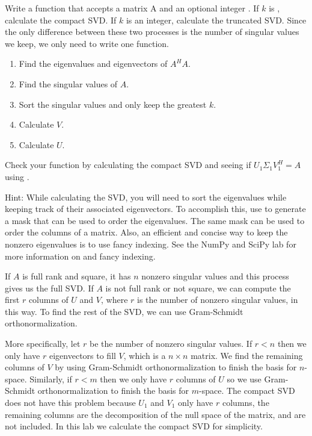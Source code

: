 \begin{problem}
Write a function  that accepts a matrix A and an optional integer . If $k$ is , calculate the compact SVD. If $k$ is an integer, calculate the truncated SVD.
Since the only difference between these two processes is the number of singular values we keep, we only need to write one function.

\begin{enumerate}
\item Find the eigenvalues and eigenvectors of $A^H A$.
\item Find the singular values of $A$.
\item Sort the singular values and only keep the greatest $k$.
\item Calculate $V$.
\item Calculate $U$.
\end{enumerate}

Check your function by calculating the compact SVD and seeing if $U_1\Sigma_1 V_1^H = A$ using .

Hint: While calculating the SVD, you will need to sort the eigenvalues while keeping track of their associated eigenvectors. 
To accomplish this, use  to generate a mask that can be used to order the eigenvalues. The same mask can be used to order the columns of a matrix. 
Also, an efficient and concise way to keep the nonzero eigenvalues is to use fancy indexing. 
See the NumPy and SciPy lab for more information on  and fancy indexing. 

\label{prob:calc_svd}
\end{problem}

If $A$ is full rank and square, it has $n$ nonzero singular values and this process gives us the full SVD.
If $A$ is not full rank or not square, we can compute the first $r$ columns of $U$ and $V$, where $r$ is the number of nonzero singular values, in this way.
To find the rest of the SVD, we can use Gram-Schmidt orthonormalization.

More specifically, let $r$ be the number of nonzero singular values.
If $r<n$ then we only have $r$ eigenvectors to fill $V$, which is a $n\times n$ matrix.
We find the remaining columns of $V$ by using Gram-Schmidt orthonormalization to finish the basis for $n$-space.
Similarly, if $r<m$ then we only have $r$ columns of $U$ so we use Gram-Schmidt orthonormalization to finish the basis for $m$-space.
The compact SVD does not have this problem because $U_1$ and $V_1$ only have $r$ columns, the remaining columns are the decomposition of the null space of the matrix, and are not included.
In this lab we calculate the compact SVD for simplicity.


